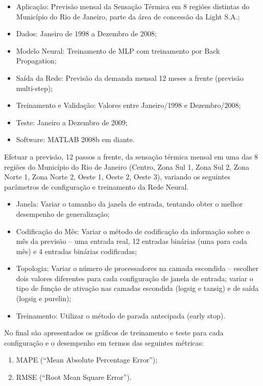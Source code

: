 \documentclass[journal, a4paper]{IEEEtran}
\begin{document}
\begin{itemize}[\textbf{Detalhamento}]
	 \item{Aplicação:} Previsão mensal da Sensação Térmica em 8 regiões distintas do
	 Município do Rio de Janeiro, parte da área de concessão da Light S.A.;
     \item{Dados:} Janeiro de 1998 a Dezembro de 2008;
     \item{Modelo Neural:} Treinamento de MLP com treinamento por Back Propagation;
     \item{Saída da Rede:} Previsão da demanda mensal 12 meses a frente (previsão multi-step);
     \item{Treinamento e Validação:} Valores entre Janeiro/1998 e Dezembro/2008;
     \item{Teste:} Janeiro a Dezembro de 2009;
     \item{Software:} MATLAB 2008b em diante.
\end{itemize}

Efetuar a previsão, 12 passos a frente, da sensação térmica mensal em uma das 8 regiões do Município do Rio de Janeiro (Centro, Zona Sul 1, Zona Sul 2, Zona Norte 1, Zona Norte 2, Oeste 1, Oeste 2, Oeste 3), variando os seguintes parâmetros de configuração e treinamento da
Rede Neural.\\

\begin{itemize}[\textbf{Testes}]
	\item{Janela:} Variar o tamanho da janela de entrada, tentando obter o melhor desempenho de generalização;
	\item{Codificação do Mês:} Variar o método de codificação da informação sobre o mês da
	previsão – uma entrada real, 12 entradas binárias (uma para cada mês)
	e 4 entradas binárias codificadas;
	\item{Topologia:} Variar o número de processadores na camada escondida – escolher
	dois valores diferentes para cada configuração de janela de entrada;
	variar o tipo de função de ativação nas camadas escondida (logsig e
	tansig) e de saída (logsig e purelin);
	\item{Treinamento:} Utilizar o método de parada antecipada (early stop).
\end{itemize}

No final são apresentados os gráficos de treinamento e teste para cada configuração e
o desempenho em termos das seguintes métricas:
\begin{enumerate}
	\item MAPE (“Mean Absolute Percentage Error”);
	\item RMSE (“Root Mean Square Error”).
\end{enumerate}
\end{document}
